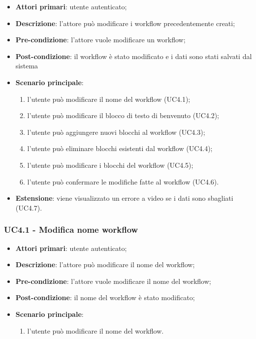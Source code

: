 \begin{itemize}
\item \textbf{Attori primari}: utente autenticato;

\item \textbf{Descrizione}: l'attore può modificare i workflow precedentemente creati;

\item \textbf{Pre-condizione}: l'attore vuole modificare un workflow;

\item \textbf{Post-condizione}: il workflow è stato modificato e i dati sono stati salvati dal sistema

\item \textbf{Scenario principale}:
\begin{enumerate}
\item l'utente può modificare il nome del workflow (UC4.1);
\item l'utente può modificare il blocco di testo di benvenuto (UC4.2);
\item l'utente può aggiungere nuovi blocchi al workflow (UC4.3);
\item l'utente può eliminare blocchi esistenti dal workflow (UC4.4);
\item l'utente può modificare i blocchi del workflow (UC4.5);
\item l'utente può confermare le modifiche fatte al workflow (UC4.6).
\end{enumerate}
\item \textbf{Estensione}: viene visualizzato un errore a video se i dati sono sbagliati (UC4.7).
\end{itemize}

\subsubsection{UC4.1 - Modifica nome workflow}

\begin{itemize}
\item \textbf{Attori primari}: utente autenticato;

\item \textbf{Descrizione}: l'attore può modificare il nome del workflow;

\item \textbf{Pre-condizione}: l'attore vuole modificare il nome del workflow;

\item \textbf{Post-condizione}: il nome del workflow è stato modificato;

\item \textbf{Scenario principale}:
\begin{enumerate}
\item l'utente può modificare il nome del workflow.
\end{enumerate}
\end{itemize}

